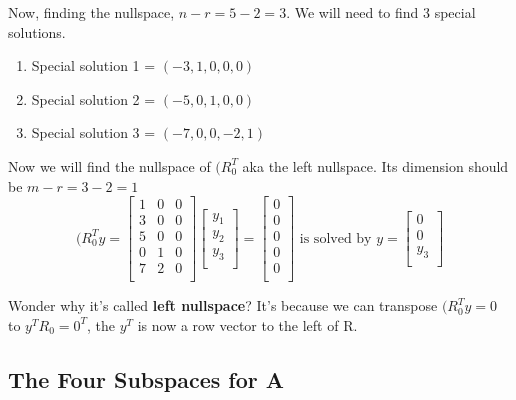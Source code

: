 Now, finding the nullspace, \(n - r = 5 - 2 = 3\). We will need to find 3 special solutions. 
\begin{enumerate}
    \item Special solution 1 = \((-3, 1, 0, 0, 0)\) 
    \item Special solution 2 = \((-5, 0, 1, 0, 0)\) 
    \item Special solution 3 = \((-7, 0, 0, -2, 1)\) 
\end{enumerate} 
Now we will find the nullspace of \((R^{T}_{0}\) aka the left nullspace. Its dimension should be \(m - r = 3 - 2 = 1\)  
\[
    (R^{T}_{0}y = 
    \begin{bmatrix}
        1 & 0 & 0  \\
        3 & 0 & 0  \\
        5 & 0 & 0  \\
        0 & 1 & 0  \\
        7 & 2 & 0  \\
    \end{bmatrix}
    \begin{bmatrix}
         y_1 \\
         y_2 \\
         y_3 \\
    \end{bmatrix}
    = 
    \begin{bmatrix}
         0 \\
         0 \\
         0 \\
         0 \\
         0 \\
    \end{bmatrix}
    \text{ is solved by }
    y = 
    \begin{bmatrix}
         0 \\
         0 \\
         y_3 \\
    \end{bmatrix}
\]

Wonder why it's called \textbf{left nullspace}? It's because we can transpose \((R^{T}_{0}y = 0\) to \(y^{T}R_0 = 0^T\), the \(y^T\) is now a row vector to the left of R.

\subsection{The Four Subspaces for A}


